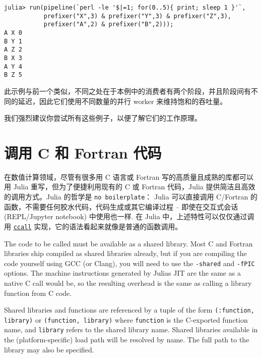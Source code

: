 \begin{verbatim}
julia> run(pipeline(`perl -le '$|=1; for(0..5){ print; sleep 1 }'`,
           prefixer("X",3) & prefixer("Y",3) & prefixer("Z",3),
           prefixer("A",2) & prefixer("B",2)));
A X 0
B Y 1
A Z 2
B X 3
A Y 4
B Z 5
\end{verbatim}



此示例与前一个类似，不同之处在于本例中的消费者有两个阶段，并且阶段间有不同的延迟，因此它们使用不同数量的并行 worker 来维持饱和的吞吐量。



我们强烈建议你尝试所有这些例子，以便了解它们的工作原理。



\hypertarget{6259308371449123088}{}


\chapter{调用 C 和 Fortran 代码}



在数值计算领域，尽管有很多用 C 语言或 Fortran 写的高质量且成熟的库都可以用 Julia 重写，但为了便捷利用现有的 C 或 Fortran 代码，Julia 提供简洁且高效的调用方式。Julia 的哲学是 \texttt{no boilerplate}： Julia 可以直接调用 C/Fortran 的函数，不需要任何{\textquotedbl}胶水{\textquotedbl}代码，代码生成或其它编译过程 – 即使在交互式会话 (REPL/Jupyter notebook) 中使用也一样. 在 Julia 中，上述特性可以仅仅通过调用 \hyperlink{14245046751182637566}{\texttt{ccall}} 实现，它的语法看起来就像是普通的函数调用。



The code to be called must be available as a shared library. Most C and Fortran libraries ship compiled as shared libraries already, but if you are compiling the code yourself using GCC (or Clang), you will need to use the \texttt{-shared} and \texttt{-fPIC} options. The machine instructions generated by Julia{\textquotesingle}s JIT are the same as a native C call would be, so the resulting overhead is the same as calling a library function from C code. \footnotemark[1]



Shared libraries and functions are referenced by a tuple of the form \texttt{(:function, {\textquotedbl}library{\textquotedbl})} or \texttt{({\textquotedbl}function{\textquotedbl}, {\textquotedbl}library{\textquotedbl})} where \texttt{function} is the C-exported function name, and \texttt{library} refers to the shared library name.  Shared libraries available in the (platform-specific) load path will be resolved by name.  The full path to the library may also be specified.



